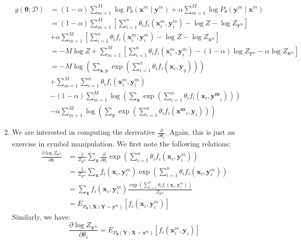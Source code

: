 \documentclass[12pt]{article}
\newcommand{\vect}[1]{\boldsymbol{#1}}
\begin{document}
\begin{enumerate}[label=(\alph*)]
  \begin{align*}
  	g(\vect{\theta}; \mathcal{D}) &= (1- \alpha)\sum_{m=1}^M \log P_{\theta}(\vect{x}^m \mid \vect{y}^m)  + \alpha \sum_{m=1}^M  \log P_{\theta}(\vect{y}^m \mid \vect{x}^m) \\
  	&= (1- \alpha)\sum_{m=1}^M \left[\sum_{i=1}^n \theta_i f_i (\vect{x}_i^m, \vect{y}_i^m) - \log Z - \log Z_{\vect{y}^m}\right]  \\
  	&+ \alpha \sum_{m=1}^M \left[\sum_{i=1}^n \theta_i f_i (\vect{x}_i^m, \vect{y}_i^m) - \log Z - \log Z_{\vect{x}^m}\right] \\
  	&= -M\log Z  + \sum_{m=1}^M \left[\sum_{i=1}^n \theta_i f_i(\vect{x}_i^m, \vect{y}_i^m) - (1-\alpha) \log Z_{\vect{y}^m} - \alpha \log Z_{\vect{x}^m} \right] \\
  	&= -M \log \left(\sum_{\vect{x}, \vect{y}} \exp\left(\sum_{i=1}^n \theta_i f_i(\vect{x}_i, \vect{y}_y)\right) \right) \\
  	&+ \sum_{m=1}^M \sum_{i=1}^n \theta_i f_i(\vect{x}_i^m, \vect{y}_i^m) \\
  	&- (1-\alpha) \sum_{m=1}^M \log \left(\sum_{\vect{x}} \exp\left(\sum_{i =1}^n \theta_i f_i(\vect{x}_i, \vect{y^m}_i)\right)\right) \\
  	&- \alpha \sum_{m=1}^M \log \left(\sum_{\vect{y}} \exp\left(\sum_{i =1}^n \theta_i f_i(\vect{x^m}_i, \vect{y}_i)\right) \right)
  \end{align*}
  \item We are interested in computing the derivative $\frac{\partial}{\partial \theta_i}$. Again, this is just an exercise in symbol manipulation. We first note the following relations:
  \begin{align*}
  	\frac{\partial \log Z_{\vect{y}^m}}{\partial \theta_i} &= \frac{1}{Z_{\vect{y}^m}} \sum_{\vect{x}} \frac{\partial}{\partial \theta_i} \exp\left(\sum_{i =1}^n \theta_i f_i(\vect{x}_i, \vect{y}^m_i)\right) \\
  	&= \frac{1}{Z_{\vect{y}^m}} \sum_{\vect{x}} f_i(\vect{x}_i, \vect{y}_i^m) \exp\left(\sum_{i =1}^n \theta_i f_i(\vect{x}_i, \vect{y}^m_i)\right)  \\
  	&= \sum_{\vect{x}} f_i(\vect{x}_i, \vect{y}_i^m) \frac{\exp\left(\sum_{i =1}^n \theta_i f_i(\vect{x}_i, \vect{y}^m_i)\right) }{Z_{\vect{y}^m}} \\
  	&= E_{P_{\vect{\theta}}(\vect{X} \mid \vect{Y} = \vect{y}^{m})}[f_i(\vect{x}_i, \vect{y}_i^m)]
  \end{align*}
  Similarly, we have:
  $$
  	\frac{\partial\log Z_{\vect{x}^m}}{\partial \theta_i}  = E_{P_{\vect{\theta}}(\vect{Y} \mid \vect{X} = \vect{x}^{m})}[f_i(\vect{x}_i^m, \vect{y}_i)]
$$
\end{enumerate}
\end{document}
